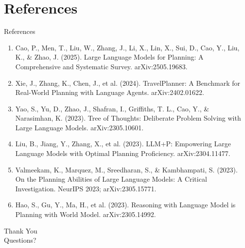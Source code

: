 \documentclass[10pt]{beamer}
\begin{document}
\section{References}
\begin{frame}[allowframebreaks]{References}
  \footnotesize
  \begin{enumerate}
    \item Cao, P., Men, T., Liu, W., Zhang, J., Li, X., Lin, X., Sui, D., Cao, Y., Liu, K., \& Zhao, J. (2025). Large Language Models for Planning: A Comprehensive and Systematic Survey. arXiv:2505.19683.
    \item Xie, J., Zhang, K., Chen, J., et al. (2024). TravelPlanner: A Benchmark for Real-World Planning with Language Agents. arXiv:2402.01622.
    \item Yao, S., Yu, D., Zhao, J., Shafran, I., Griffiths, T. L., Cao, Y., \& Narasimhan, K. (2023). Tree of Thoughts: Deliberate Problem Solving with Large Language Models. arXiv:2305.10601.
    \item Liu, B., Jiang, Y., Zhang, X., et al. (2023). LLM+P: Empowering Large Language Models with Optimal Planning Proficiency. arXiv:2304.11477.
    \item Valmeekam, K., Marquez, M., Sreedharan, S., \& Kambhampati, S. (2023). On the Planning Abilities of Large Language Models: A Critical Investigation. NeurIPS 2023; arXiv:2305.15771.
    \item Hao, S., Gu, Y., Ma, H., et al. (2023). Reasoning with Language Model is Planning with World Model. arXiv:2305.14992.
  \end{enumerate}
\end{frame}
\begin{frame}[plain]
  \begin{center}
    {\Huge Thank You}\\[1em]
    {\large Questions?}
  \end{center}
\end{frame}
\end{document}
